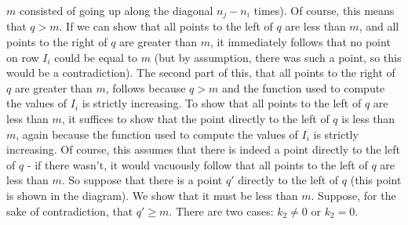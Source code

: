 \documentclass{article}
\theoremstyle{definition}
\begin{document}
$m$ consisted of going up along the diagonal $n_j-n_i$ times). Of course, this means that $q>m$. If we can show that all points 
to the left of $q$ are less than $m$, and all points to the right of $q$ are greater than $m$, it immediately follows that no point on 
row $I_i$ could be equal to $m$ (but by assumption, there was such a point, so this would be a contradiction). 
The second part of this, that all points to the right of $q$ are greater than $m$, follows because 
$q>m$ and the function used to compute the values of $I_i$ is strictly increasing. To show that all points to the left of 
$q$ are less than $m$, it suffices to show that the point directly to the left of $q$ is less than $m$, again because 
the function used to compute the values of $I_i$ is strictly increasing. Of course, this assumes that there is indeed a point 
directly to the left of $q$ - if there wasn't, it would vacuously follow that all points to the left of $q$ are less than $m$. So 
suppose that there is a point $q'$ directly to the left of $q$ (this point is shown in the diagram). We show that it must be less than $m$. Suppose, for the sake of 
contradiction, that $q'\ge m$.
There are two cases: $k_2\ne 0$ or $k_2=0$.
\end{document}
